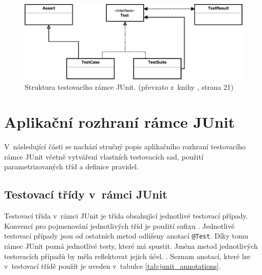    \begin{figure}
      \includegraphics[width=\textwidth, center]{obrazky-figures/junit_arch.pdf}
      \caption{Struktura testovacího rámce JUnit. (převzato z~knihy \cite{JUnitGuide}, strana 21)}
      \label{fig:junit_arch}
    \end{figure}


  \section{Aplikační rozhraní rámce JUnit}
  V~následující části se nachází stručný popis aplikačního rozhraní testovacího rámce JUnit včetně vytváření vlastních testovacích sad, použití parametrizovaných tříd a definice pravidel.

    \subsection{Testovací třídy v~rámci JUnit}
    Testovací třída v~rámci JUnit je třída obsahující jednotlivé testovací případy. Konvencí pro pojmenování jednotlivých tříd je použití sufixu . Jednotlivé testovací případy jsou od ostatních metod odlišeny anotací \texttt{@Test}. Díky tomu rámec JUnit pozná jednotlivé testy, které má spustit. Jména metod jednotlivých testovacích případů by měla reflektovat jejich účel.  \cite{vogella:JUnit}. Seznam anotací, které lze v~testovací třídě použít je uveden v~tabulce \ref{tab:junit_annotations}.

